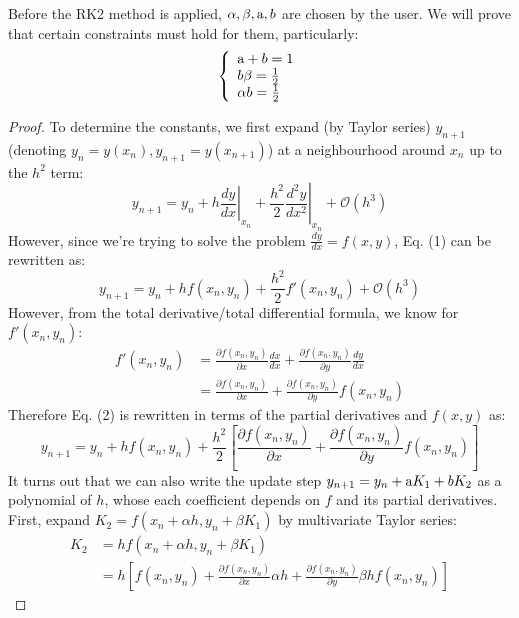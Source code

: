 \documentclass[a4paper]{article}
\begin{document}
Before the RK2 method is applied, $\alpha, \beta, \textup{a}, b$ are chosen by the user. We will prove that certain constraints must hold for them, particularly:
\begin{equation}
    \left \{
        \begin{array}{l}
            \textup{a} + b = 1 \\
            b \beta = \frac{1}{2} \\
            \alpha b = \frac{1}{2}
        \end{array}
    \right.
\end{equation}
\begin{proof}
To determine the constants, we first expand (by Taylor series) $y_{n+1} $ (denoting $y_n = y(x_n), y_{n+1} = y(x_{n+1})$) at a neighbourhood around $x_{n}$ up to the $h^2$ term:
\[
    y_{n+1} = y_n + h\left. \frac{dy}{dx} \right|_{x_n} + \frac{h^2}{2}\left.\frac{d^2y}{dx^2}\right|_{x_n} + \mathcal{O}(h^3)
    \tag{1}
\]
However, since we're trying to solve the problem $\tfrac{dy}{dx} = f(x,y)$, Eq. (1) can be rewritten as:
\[
    y_{n+1} = y_n + hf(x_n,y_n)+ \frac{h^2}{2}f'(x_n,y_n) + \mathcal{O}(h^3)
    \tag{2}
\]
However, from the total derivative/total differential formula, we know for $f'(x_n,y_n)$:
\begin{align*}
    f'(x_n,y_n) &= \frac{\partial f(x_n,y_n)}{\partial x}\frac{dx}{dx} + \frac{\partial f(x_n,y_n)}{\partial y} \frac{dy}{dx} \\
    &= \frac{\partial f(x_n,y_n)}{\partial x} + \frac{\partial f(x_n,y_n)}{\partial y} f(x_n,y_n)
\end{align*}
Therefore Eq. (2) is rewritten in terms of the partial derivatives and $f(x,y)$ as:
\[
y_{n+1} = y_n + hf(x_n,y_n)+ \frac{h^2}{2}
\left[ \frac{\partial f(x_n,y_n)}{\partial x} + \frac{\partial f(x_n,y_n)}{\partial y} f(x_n,y_n)  \right]
\tag{3}
\]
It turns out that we can also write the update step $y_{n+1} = y_n + \textup{a}K_1 + b K_2$ as a polynomial of $h$, whose each coefficient depends on $f$ and its partial derivatives. First, expand $K_2 = f(x_n + \alpha h, y_n + \beta K_1)$ by multivariate Taylor series:
\begin{align*}
    K_2 &= h f(x_n + \alpha h, y_n + \beta K_1) \\
    &= h \left[ f(x_n, y_n) + \frac{\partial f(x_n, y_n)}{\partial x} \alpha h + \frac{\partial f(x_n, y_n)}{\partial y} \beta h f(x_n, y_n) \right]
\end{align*}

\end{proof}
\end{document}
